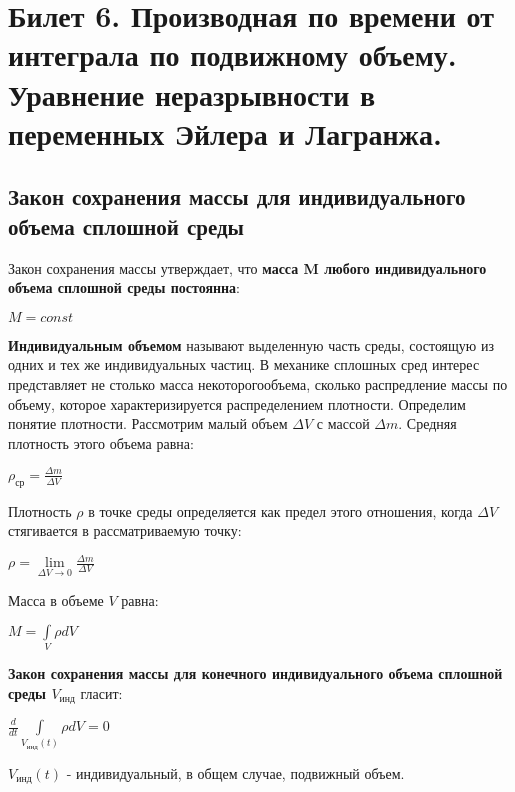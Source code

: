 \newpage
\section{Билет 6. Производная по времени от интеграла по подвижному объему. Уравнение неразрывности в переменных Эйлера и Лагранжа.}
\subsection{Закон сохранения массы для индивидуального объема сплошной среды}
Закон сохранения массы утверждает, что \textbf{масса M любого индивидуального объема сплошной среды постоянна}:
\begin{center}$
M = const
$\end{center}
\textbf{Индивидуальным объемом} называют выделенную часть среды, состоящую из одних и тех же индивидуальных частиц. В механике сплошных сред интерес представляет не столько масса некоторогообъема, сколько распредление массы по объему, которое характеризируется распределением плотности. Определим понятие плотности. Рассмотрим малый объем $\Delta {V}$ с массой $\Delta m$. Средняя плотность этого объема равна:
\begin{center}$
\rho_{ср} = \frac{\Delta m}{\Delta V}
$\end{center}

Плотность $\rho$ в точке среды определяется как предел этого отношения, когда $\Delta V$ стягивается в рассматриваемую точку:
\begin{center}$
\rho = \lim\limits_{\Delta V \to 0} \frac{\Delta m}{\Delta V}
$\end{center}

Масса в объеме $V$ равна:
\begin{center}$
M = \int\limits_V \rho dV
$\end{center}

\textbf{Закон сохранения массы для конечного индивидуального объема сплошной среды $V_{инд}$} гласит:
\begin{center}$
\frac{d}{dt} \int\limits_{V_{инд}(t)} \rho dV = 0
$\end{center}

$V_{инд}(t)$ - индивидуальный, в общем случае, подвижный объем.

